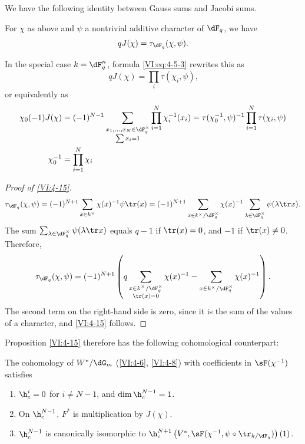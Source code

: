\documentclass[oneside]{book}
\begin{document}
We have the following identity between Gauss sums and Jacobi sums. 





\begin{proposition_}\label{VI:4-15}
For $\chi$ as above and $\psi$ a nontrivial additive character of 
$\dF_q$, we have 
\[
  q J(\chi) = \tau_{\dF_q}(\chi,\psi) \text{.} 
\]
\end{proposition_}

In the special case $k=\dF_q^n$, formula \eqref{VI:eq:4-5-3} rewrites this as 
\begin{equation*}\tag{4.15.1}\label{VI:eq:4-15-1}
  q J(\chi) = \prod_i \tau(\chi_i,\psi) \text{,} 
\end{equation*}
or equivalently as 
\begin{align*}
  \chi_0(-1) J(\chi) &= (-1)^{N-1} \sum_{\substack{x_1,\dots,x_N\in \dF_q^\times \\ \sum x_i = 1}} \prod_{i=1}^N \chi_i^{-1}(x_i) = \tau(\chi_0^{-1},\psi)^{-1} \prod_{i=1}^N \tau(\chi_i,\psi) \\
  \chi_0^{-1} &= \prod_{i=1}^N \chi_i 
\end{align*}





\begin{proof}[Proof of \ref{VI:4-15}]
\[
  \tau_{\dF_q}(\chi,\psi) = (-1)^{N+1} \sum_{x\in k^\times} \chi(x)^{-1} \psi \tr(x) = (-1)^{N+1} \sum_{x\in k^\times/\dF_q^\times} \chi(x)^{-1} \sum_{\lambda\in \dF_q^\times} \psi(\lambda \tr x) \text{.}
\]
The sum $\sum_{\lambda\in \dF_q^\times} \psi(\lambda \tr x)$ equals $q-1$ if 
$\tr(x)=0$, and $-1$ if $\tr(x)\ne 0$. Therefore, 
\[
  \tau_{\dF_q}(\chi,\psi) = (-1)^{N+1} \left(q\sum_{\substack{x\in k^\times/\dF_q^\times \\ \tr(x)=0}} \chi(x)^{-1} - \sum_{x\in k^\times/\dF_q^\times} \chi(x)^{-1}\right) \text{.}
\]
The second term on the right-hand side is zero, since it is the sum of the values 
of a character, and \ref{VI:4-15} follows. 
\end{proof}

Proposition \ref{VI:4-15} therefore has the following cohomological counterpart: 





\begin{proposition_}\label{VI:4-16}
The cohomology of $W^\ast/\dG_m$ (\ref{VI:4-6}, \ref{VI:4-8}) with coefficients 
in $\sF(\chi^{-1})$ satisfies 
\begin{enumerate}[\indent (i)]
  \item $\h_c^i=0$ for $i\ne N-1$, and $\dim \h_c^{N-1}{}=1$. 
  \item On $\h_c^{N-1}$, $F^\ast$ is multiplication by $J(\chi)$. 
  \item $\h_c^{N-1}$ is canonically isomorphic to 
    $\h_c^{N+1}\left(V^\ast,\sF(\chi^{-1},\psi\circ \tr_{k/\dF_q})\right)(1)$. 
\end{enumerate}
\end{proposition_}
\end{document}
